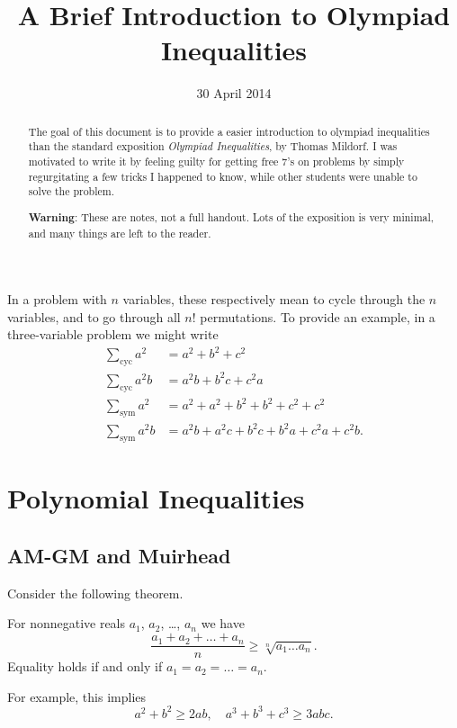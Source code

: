 \documentclass[11pt]{scrartcl}
\begin{document}
\title{A Brief Introduction to Olympiad Inequalities}
\date{30 April 2014}
\maketitle

\begin{abstract}
  The goal of this document is to provide a easier introduction to olympiad inequalities
  than the standard exposition \emph{Olympiad Inequalities}, by Thomas Mildorf.
  I was motivated to write it by feeling guilty for getting
  free $7$'s on problems by simply regurgitating a few tricks I happened to know,
  while other students were unable to solve the problem.

  \textbf{Warning}: These are notes, not a full handout.
  Lots of the exposition is very minimal, and many things are left to the reader.
\end{abstract}

In a problem with $n$ variables, these respectively mean to cycle through the $n$ variables,
and to go through all $n!$ permutations.
To provide an example, in a three-variable problem we might write
\begin{align*}
  \sum_{\text{cyc}} a^2 &= a^2+b^2+c^2 \\
  \sum_{\text{cyc}} a^2b &= a^2b+b^2c+c^2a \\
  \sum_{\text{sym}} a^2 &= a^2+a^2+b^2+b^2+c^2+c^2 \\
  \sum_{\text{sym}} a^2b &= a^2b+a^2c+b^2c+b^2a+c^2a+c^2b.
\end{align*}

\section{Polynomial Inequalities}
\subsection{AM-GM and Muirhead}
Consider the following theorem.
\begin{theorem}
  [AM-GM] For nonnegative reals $a_1$, $a_2$, \dots, $a_n$ we have
  \[ \frac{a_1 + a_2 + \dots + a_n}{n} \ge \sqrt[n]{a_1 \dots a_n}. \]
  Equality holds if and only if $a_1 = a_2 = \dots = a_n$.
\end{theorem}
For example, this implies \[ a^2+b^2 \ge 2ab, \quad a^3+b^3+c^3 \ge 3abc. \]
\end{document}

